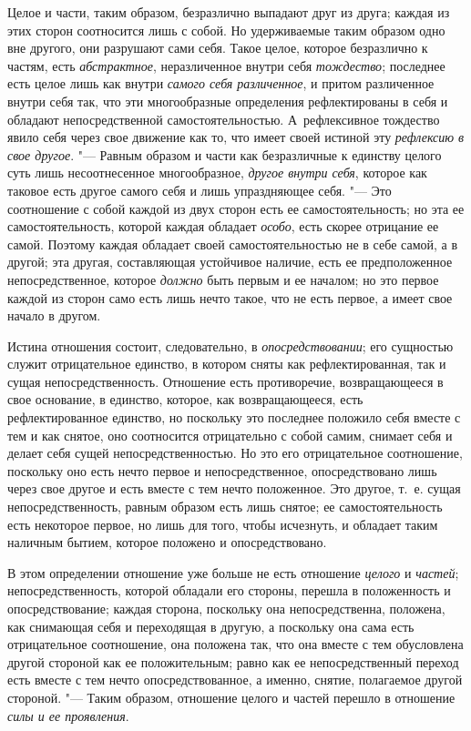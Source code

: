 Целое и части, таким образом, безразлично выпадают друг из друга; каждая из
этих сторон соотносится лишь с собой. Но удерживаемые таким образом одно
вне другого, они разрушают сами себя. Такое целое, которое безразлично к
частям, есть {\em абстрактное}, неразличенное внутри
себя {\em тождество}; последнее есть целое лишь как
внутри {\em самого себя различенное}, и притом
различенное внутри себя так, что эти многообразные определения
рефлектированы в себя и обладают непосредственной самостоятельностью.
А~рефлексивное тождество явило себя через свое движение как то, что имеет
своей истиной эту {\em рефлексию в свое другое}. "---
Равным образом и части как безразличные к единству целого суть лишь
несоотнесенное многообразное, {\em другое внутри себя},
которое как таковое есть другое самого себя и лишь упраздняющее себя. "--- Это
соотношение с собой каждой из двух сторон есть ее самостоятельность; но эта
ее самостоятельность, которой каждая обладает
{\em особо}, есть скорее отрицание ее самой. Поэтому
каждая обладает своей самостоятельностью не в себе самой, а в другой; эта
другая, составляющая устойчивое наличие, есть ее предположенное
непосредственное, которое {\em должно} быть первым и ее
началом; но это первое каждой из сторон само есть лишь нечто такое, что не
есть первое, а имеет свое начало в другом.

Истина отношения состоит, следовательно, в
{\em опосредствовании}; его сущностью служит
отрицательное единство, в котором сняты как рефлектированная, так и сущая
непосредственность. Отношение есть противоречие, возвращающееся в свое
основание, в единство, которое, как возвращающееся, есть рефлектированное
единство, но поскольку это последнее положило себя вместе с тем и как
снятое, оно соотносится отрицательно с собой самим, снимает себя и делает
себя сущей непосредственностью. Но это его отрицательное соотношение,
поскольку оно есть нечто первое и непосредственное, опосредствовано лишь
через свое другое и есть вместе с тем нечто положенное. Это другое, т.~е.
сущая непосредственность, равным образом есть лишь снятое; ее
самостоятельность есть некоторое первое, но лишь для того, чтобы исчезнуть,
и обладает таким наличным бытием, которое положено и опосредствовано.

В этом определении отношение уже больше не есть отношение
{\em целого} и {\em частей};
непосредственность, которой обладали его стороны, перешла в положенность и
опосредствование; каждая сторона, поскольку она непосредственна, положена,
как снимающая себя и переходящая в другую, а поскольку она сама есть
отрицательное соотношение, она положена так, что она вместе с тем
обусловлена другой стороной как ее положительным; равно как ее
непосредственный переход есть вместе с тем нечто опосредствованное, а
именно, снятие, полагаемое другой стороной. "--- Таким образом, отношение
целого и частей перешло в отношение {\em силы и ее
проявления}.



